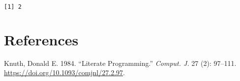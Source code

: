 \documentclass[
  letterpaper,
  DIV=11,
  numbers=noendperiod]{scrreprt}
\newlength{\cslhangindent}
\newlength{\cslentryspacingunit} %
\newenvironment{CSLReferences}[2] %
 {%
  \setlength{\parindent}{0pt}
  \ifodd #1
  \let\oldpar\par
  \def\par{\hangindent=\cslhangindent\oldpar}
  \fi
  \setlength{\parskip}{#2\cslentryspacingunit}
 }%
 {}
\begin{document}
\begin{verbatim}
[1] 2
\end{verbatim}


\hypertarget{references}{%
\chapter*{References}\label{references}}


\hypertarget{refs}{}
\begin{CSLReferences}{1}{0}
\leavevmode{}%
Knuth, Donald E. 1984. {``Literate Programming.''} \emph{Comput. J.} 27
(2): 97--111. \url{https://doi.org/10.1093/comjnl/27.2.97}.

\end{CSLReferences}
\end{document}
